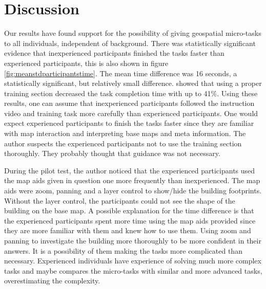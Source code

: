 \chapter{Discussion}
Our results have found support for the possibility of giving geospatial micro-tasks to all individuals, independent of background. There was statistically significant evidence that inexperienced participants finished the tasks faster than experienced participants, this is also shown in figure \ref{fig:meanstdparticipantstime}. The mean time difference was 16 seconds, a statistically significant, but relatively small difference. \cite{Gadiraju2015a} showed that using a proper training section decreased the task completion time with up to 41\%. Using these results, one can assume that inexperienced participants followed the instruction video and training task more carefully than experienced participants. One would expect experienced participants to finish the tasks faster since they are familiar with map interaction and interpreting base maps and meta information. The author suspects the experienced participants not to use the training section thoroughly. They probably thought that guidance was not necessary. 

During the pilot test, the author noticed that the experienced participants used the map aids given in question one more frequently than inexperienced. The map aids were zoom, panning and a layer control to show/hide the building footprints. Without the layer control, the participants could not see the shape of the building on the base map. A possible explanation for the time difference is that the experienced participants spent more time using the map aids provided since they are more familiar with them and knew how to use them. Using zoom and panning to investigate the building more thoroughly to be more confident in their answers. It is a possibility of them making the tasks more complicated than necessary. Experienced individuals have experience of solving much more complex tasks and maybe compares the micro-tasks with similar and more advanced tasks, overestimating the complexity. 

